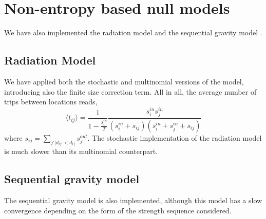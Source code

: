 \documentclass[aps,floatfix,noshowpacs,superscriptaddress]{revtex4}
\begin{document}
\section{Non-entropy based null models}
We have also implemented the radiation model \cite{Simini2012a} and the sequential gravity model \cite{Lenormand2012}.

\subsection{Radiation Model}
We have applied both the stochastic and multinomial versions of the model, introducing also the finite size correction term. All in all, the average number of trips between locations reads,
\begin{equation}
\langle t_{ij} \rangle = \frac{1}{1-\frac{s_i^{in}}{T}} \frac{s_i^{in} s_j^{in}}{(s_i^{in} + s_{ij})(s_i^{in} + s_j^{in} +s_{ij}) }
\end{equation}
where $s_{ij} = \sum_{j'|d_{ij'}<d_{ij}} s_{j'}^{out}$. The stochastic implementation of the radiation model is much slower than its multinomial counterpart.

\subsection{Sequential gravity model}
The sequential gravity model is also implemented, although this model has a slow convergence depending on the form of the strength sequence considered.




\end{document}
